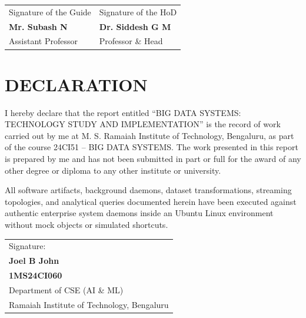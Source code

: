 \documentclass[12pt,a4paper]{report}
\newcommand{\ProjectTitle}{BIG DATA SYSTEMS: TECHNOLOGY STUDY AND IMPLEMENTATION}
\newcommand{\CourseCode}{24CI51 -- BIG DATA SYSTEMS}
\newcommand{\StudentOne}{Joel B John}
\newcommand{\USNOne}{1MS24CI060}
\newcommand{\GuideOne}{Mr. Subash N}
\newcommand{\GuideDesignation}{Assistant Professor}
\newcommand{\HOD}{Dr. Siddesh G M}
\newcommand{\HODDesignation}{Professor \& Head}
\begin{document}
\vspace{3.5cm}

\begin{tabularx}{\textwidth}{X X}
\centering Signature of the Guide &
\centering\arraybackslash Signature of the HoD\\[0.4cm]
\centering \textbf{\GuideOne} &
\centering\arraybackslash \textbf{\HOD}\\
\centering \GuideDesignation &
\centering\arraybackslash \HODDesignation\\
\end{tabularx}

\clearpage

\chapter*{DECLARATION}

I hereby declare that the report entitled ``\ProjectTitle'' is the
record of work carried out by me at M. S. Ramaiah Institute of
Technology, Bengaluru, as part of the course \CourseCode. The work
presented in this report is prepared by me and has not been submitted
in part or full for the award of any other degree or diploma to any other institute or university.

All software artifacts, background daemons, dataset transformations, streaming topologies, and analytical queries documented herein have been executed against authentic enterprise system daemons inside an Ubuntu Linux environment without mock objects or simulated shortcuts.

\vspace{2.5cm}

\begin{flushright}
\begin{tabular}{l}
Signature:\\[1.0cm]
\textbf{\StudentOne}\\
\textbf{\USNOne}\\
Department of CSE (AI \& ML)\\
Ramaiah Institute of Technology, Bengaluru
\end{tabular}
\end{flushright}

\clearpage

\end{document}
